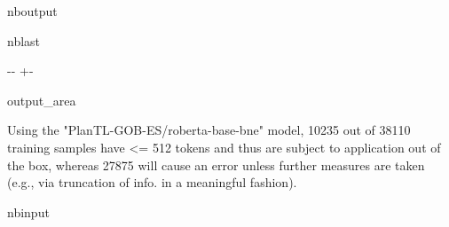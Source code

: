 \documentclass[letterpaper,10pt,english]{sphinxmanual}
\newlength\nbsphinxcodecellspacing
\begin{document}
\begin{sphinxuseclass}{nboutput}
\begin{sphinxuseclass}{nblast}
{

\kern-\sphinxverbatimsmallskipamount\kern-\baselineskip
\kern+\FrameHeightAdjust\kern-\fboxrule
\vspace{\nbsphinxcodecellspacing}

\begin{sphinxuseclass}{output_area}
\begin{sphinxuseclass}{}


\begin{sphinxVerbatim}[commandchars=\\\{\}]
Using the "PlanTL-GOB-ES/roberta-base-bne" model, 10235 out of 38110 training samples have <= 512 tokens and thus are subject to application out of the box, whereas 27875 will cause an error unless further measures are taken (e.g., via truncation of info. in a meaningful fashion).
\end{sphinxVerbatim}



\end{sphinxuseclass}
\end{sphinxuseclass}
}

\end{sphinxuseclass}
\end{sphinxuseclass}
\begin{sphinxuseclass}{nbinput}
{
\begin{sphinxVerbatim}[commandchars=\\\{\}]
\llap{\color{nbsphinxin}[61]:\,\hspace{\fboxrule}\hspace{\fboxsep}} 
\end{sphinxVerbatim}
}

\end{sphinxuseclass}
\end{document}
